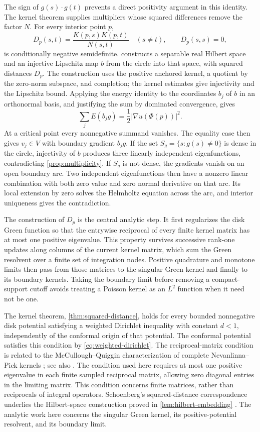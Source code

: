 The sign of $g(s)\cdot g(t)$ prevents a direct positivity argument in
this identity. The kernel theorem supplies multipliers whose squared
differences remove the factor $N$. For every interior point $p$,
\[
 D_p(s,t)=\frac{K(p,s)K(p,t)}{N(s,t)}\quad(s\ne t),
 \qquad D_p(s,s)=0,
\]
is conditionally negative semidefinite. 
constructs a separable real Hilbert space and an injective Lipschitz map
$b$ from the circle into that space, with squared distances $D_p$.
The construction uses the positive anchored kernel, a quotient by the
zero-norm subspace, and completion; the kernel estimates give injectivity
and the Lipschitz bound. Applying the energy identity to the coordinates
$b_j$ of $b$ in an orthonormal basis, and justifying the sum by dominated
convergence, gives
\[
 \sum_j E(b_jg)=\frac12|\nabla u(\Phi(p))|^2.
\]
At a critical point every nonnegative summand vanishes. The equality case
then gives $v_j\in V$ with boundary gradient $b_jg$. If the set
$S_g=\{s:g(s)\ne0\}$ is dense in the circle, injectivity of $b$ produces
three linearly independent eigenfunctions, contradicting
\cref{prop:multiplicity}. If $S_g$ is not dense, the gradients vanish
on an open boundary arc. Two independent eigenfunctions then have a
nonzero linear combination with both zero value and zero normal
derivative on that arc. Its local extension by zero solves the Helmholtz
equation across the arc, and interior uniqueness gives the contradiction.

The construction of $D_p$ is the central analytic step. It first
regularizes the disk Green function so that the entrywise reciprocal of
every finite kernel matrix has at most one positive eigenvalue. This
property survives successive rank-one updates along columns of the
current kernel matrix, which sum the Green resolvent over a finite set of
integration nodes. Positive quadrature and monotone limits then pass from
those matrices to the singular Green kernel and finally to its boundary
kernels. Taking the boundary limit before removing a compact-support
cutoff avoids treating a Poisson kernel as an $L^2$ function when it need
not be one.

The kernel theorem, \cref{thm:squared-distance}, holds for every bounded
nonnegative disk potential satisfying a weighted Dirichlet inequality
with constant $d<1$, independently of the conformal origin of that
potential. The conformal potential satisfies this condition by
\cref{eq:weighted-dirichlet}. The reciprocal-matrix condition is related
to the McCullough--Quiggin characterization of complete Nevanlinna--Pick
kernels \cite{McC92,McC94,Qui93,Qui94}; see also
\cite[Corollary 1.12]{AglerMcCarthy}. The condition used here requires at most one positive
eigenvalue in each finite sampled reciprocal matrix, allowing zero
diagonal entries in the limiting matrix. This condition concerns finite
matrices, rather than reciprocals of integral operators.
Schoenberg's squared-distance correspondence underlies the Hilbert-space
construction proved in \cref{lem:hilbert-embedding} \cite{Sch38}.
The analytic work here concerns the singular Green kernel, its
positive-potential resolvent, and its boundary limit.

